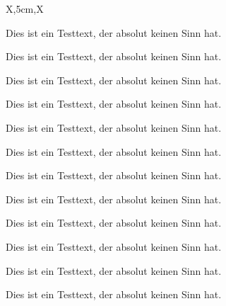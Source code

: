 \documentclass[a3paper,scifiposter,style=scifi]{tubsposter}
\begin{document}
\begin{tubsposter}[sender=bottom]{X,5cm,X}
  \begin{posterrow}
    Dies ist ein Testtext, der absolut keinen Sinn hat.
  \end{posterrow}
  \begin{posterrow}[X,3cm,X]
    \begin{postercol}[X,X]
      \begin{postersubrow}
        Dies ist ein Testtext, der absolut keinen Sinn hat.
      \end{postersubrow}
      \begin{postersubrow}
        Dies ist ein Testtext, der absolut keinen Sinn hat.
      \end{postersubrow}
    \end{postercol}
    \begin{postercol}[X,X]
      \begin{postersubrow}
        Dies ist ein Testtext, der absolut keinen Sinn hat.
      \end{postersubrow}
      \begin{postersubrow}
        Dies ist ein Testtext, der absolut keinen Sinn hat.
      \end{postersubrow}
    \end{postercol}
    \begin{postercol}
      Dies ist ein Testtext, der absolut keinen Sinn hat.
    \end{postercol}
  \end{posterrow}
  \begin{posterrow}[X,X,X,X]
    \begin{postercol}
      Dies ist ein Testtext, der absolut keinen Sinn hat.
    \end{postercol}
    \begin{postercol}[2cm,X,X]
      \begin{postersubrow}
        Dies ist ein Testtext, der absolut keinen Sinn hat.
      \end{postersubrow}
      \begin{postersubrow}
        Dies ist ein Testtext, der absolut keinen Sinn hat.
      \end{postersubrow}
      \begin{postersubrow}
        Dies ist ein Testtext, der absolut keinen Sinn hat.
      \end{postersubrow}
    \end{postercol}
    \begin{postercol}
      Dies ist ein Testtext, der absolut keinen Sinn hat.
    \end{postercol}
    \begin{postercol}
      Dies ist ein Testtext, der absolut keinen Sinn hat.
    \end{postercol}
  \end{posterrow}
\end{tubsposter}
\end{document}
